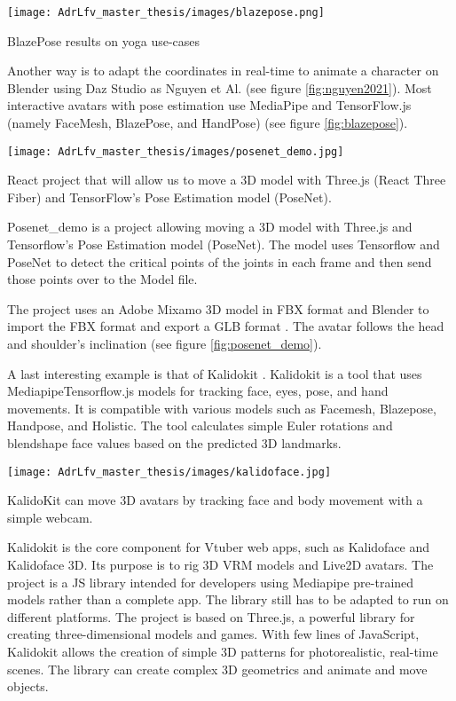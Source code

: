 \begin{marginfigure}
    \centering
    \texttt{[image: AdrLfv\_master\_thesis/images/blazepose.png]}
    \caption{BlazePose results on yoga use-cases}
    \label{fig:blazepose}
\end{marginfigure}

Another way is to adapt the coordinates in real-time to animate a character on Blender using Daz Studio as Nguyen et Al. \cite{nguyen2021automatic} (see figure \ref{fig:nguyen2021}). Most interactive avatars with pose estimation use MediaPipe and TensorFlow.js (namely FaceMesh, BlazePose, and HandPose) \cite{blazepose} (see figure \ref{fig:blazepose}).

\begin{marginfigure}
    \centering
    \texttt{[image: AdrLfv\_master\_thesis/images/posenet\_demo.jpg]}
    \caption{React project that will allow us to move a 3D model with Three.js (React Three Fiber) and TensorFlow's Pose Estimation model (PoseNet).}
    \label{fig:posenet_demo}
\end{marginfigure}

Posenet\_demo \cite{posenet_demo} is a project allowing moving a 3D model with Three.js and Tensorflow's Pose Estimation model (PoseNet). The model uses Tensorflow and PoseNet to detect the critical points of the joints in each frame and then send those points over to the Model file. 

The project uses an Adobe Mixamo \cite{mixamo} 3D model in FBX format and Blender to import the FBX format and export a GLB format \cite{posenet}. The avatar follows the head and shoulder's inclination (see figure \ref{fig:posenet_demo}).

A last interesting example is that of Kalidokit \cite{kalidokit}. Kalidokit is a tool that uses Mediapipe\/Tensorflow.js models for tracking face, eyes, pose, and hand movements.
It is compatible with various models such as Facemesh, Blazepose, Handpose, and Holistic. The tool calculates simple Euler rotations and blendshape face values based on the predicted 3D landmarks.

\begin{marginfigure}
    \centering
    \texttt{[image: AdrLfv\_master\_thesis/images/kalidoface.jpg]}
    \caption{KalidoKit can move 3D avatars by tracking face and body movement with a simple webcam.}
    \label{fig:kalidoface}
\end{marginfigure}

Kalidokit is the core component for Vtuber web apps, such as Kalidoface and Kalidoface 3D. Its purpose is to rig 3D VRM models and Live2D avatars. The project is a JS library intended for developers using Mediapipe pre-trained models rather than a complete app. The library still has to be adapted to run on different platforms. The project is based on Three.js, a powerful library for creating three-dimensional models and games. 
With few lines of JavaScript, Kalidokit allows the creation of simple 3D patterns for photorealistic, real-time scenes. The library can create complex 3D geometrics and animate and move objects.

